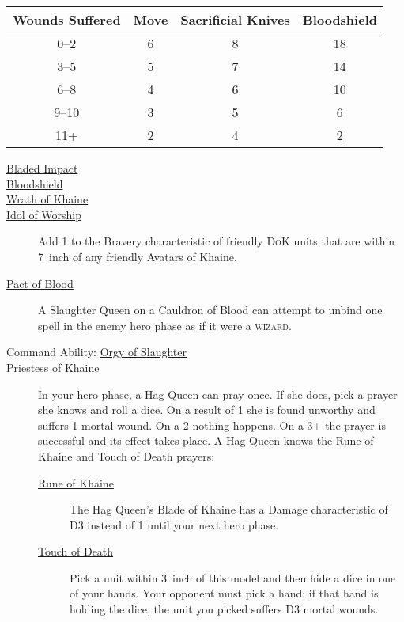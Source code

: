 \begin{scriptsize}
\noindent
    \begin{tabular}{cccc} %
    \toprule
    Wounds Suffered & Move & Sacrificial Knives & Bloodshield \\
    \midrule
    0--2 & 6 &  8  & 18 \\
    3--5 & 5 &  7  & 14 \\
    6--8 & 4 &  6  & 10 \\
    9--10& 3 &  5  &  6 \\
    11+  & 2 &  4  &  2 \\
    \bottomrule
\end{tabular}
\end{scriptsize}
\vspace{1em}


\begin{description}
    \item [{\hyperref[bladed-impact]{Bladed Impact}}] 
    \item [{\hyperref[bloodshield]{Bloodshield}}]
    \item [{\hyperref[wrath-of-khaine]{Wrath of Khaine}}] 
    \item [{\hyperref[idol-of-worship]{Idol of Worship}}] Add 1 to the Bravery
        characteristic of friendly \textsc{DoK} units that are within 7~inch
        of any friendly Avatars of Khaine.
    \item [{\hyperref[pact-of-blood]{Pact of Blood}}] A Slaughter Queen on
        a Cauldron of Blood can attempt to unbind one spell in the enemy hero
        phase as if it were a \textsc{wizard}.
    \item [Command Ability: {\hyperref[orgy-of-slaughter]{Orgy of Slaughter}}] 
    \item [Priestess of Khaine] In your \hyperref[hero-phase]{hero phase},
        a Hag Queen can pray once. If she does, pick a prayer she knows and
        roll a dice. On a result of 1 she is found unworthy and suffers
        1 mortal wound. On a 2 nothing happens. On a 3+ the prayer is
        successful and its effect takes place.  A Hag Queen knows the Rune of
        Khaine and Touch of Death prayers:
        \begin{description}
            \item [{\hyperref[rune-of-khaine]{Rune of Khaine}}] The Hag Queen's
                Blade of Khaine has a Damage characteristic of D3 instead of
                1 until your next hero phase.
            \item [{\hyperref[touch-of-death]{Touch of Death}}] Pick a unit within
                3~inch of this model and then hide a dice in one of your hands.
                Your opponent must pick a hand; if that hand is holding the
                dice, the unit you picked suffers D3 mortal wounds.
        \end{description}
\end{description}


